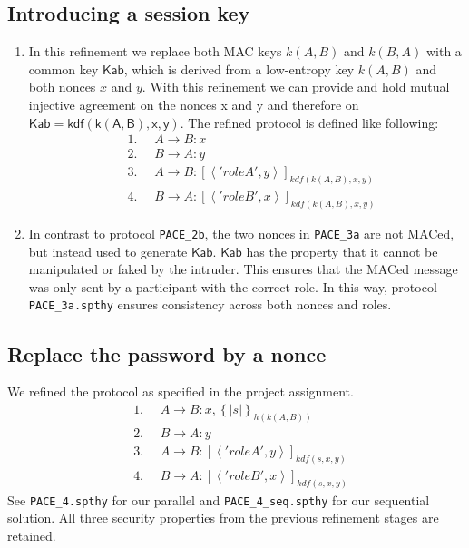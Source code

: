 \documentclass[a4paper,11pt]{scrartcl}
\newcommand{\tuple}[1]{\left\langle #1\right\rangle}
\begin{document}
\subsection{Introducing a session key}
\begin{enumerate}[label=\alph*)]
	\item In this refinement we replace both MAC keys $k(A,B)$ and $k(B,A)$ with a common key $\mathsf{Kab}$, which is derived from a low-entropy key $k(A,B)$ and both nonces $x$ and $y$.
With this refinement we can provide and hold mutual injective agreement on the nonces x and y and therefore on $\mathsf{Kab = kdf(k(A,B),x,y)}$. The refined protocol is defined like following:
	\begin{align*}
	&\text{1. }\quad A \rightarrow B: x\\
	&\text{2. }\quad B \rightarrow A: y\\
	&\text{3. }\quad A \rightarrow B: [\tuple{'roleA',  y}]_{kdf(k(A,  B), x, y)}\\
	&\text{4. }\quad B \rightarrow A: [\tuple{'roleB',  x}]_{kdf(k(A,  B), x, y)}
	\end{align*}
	\item In contrast to protocol \texttt{PACE\_2b}, the two nonces in \texttt{PACE\_3a} are not MACed, but instead used to generate $\mathsf{Kab}$.  $\mathsf{Kab}$ has the property that it cannot be manipulated or faked by the intruder. This ensures that the MACed message was only sent by a participant with the correct role. In this way,  protocol 	\texttt{PACE\_3a.spthy} ensures consistency across both nonces and roles.
\end{enumerate}
\subsection{Replace the password by a nonce}
We refined the protocol as specified in the project assignment.
	\begin{align*}
	&\text{1. }\quad A \rightarrow B: x, \left\lbrace| s | \right\rbrace_{h(k(A,B))}\\
	&\text{2. }\quad B \rightarrow A: y\\
	&\text{3. }\quad A \rightarrow B: [\tuple{'roleA',  y}]_{kdf(s, x, y)}\\
	&\text{4. }\quad B \rightarrow A: [\tuple{'roleB',  x}]_{kdf(s, x, y)}
	\end{align*}
See \texttt{PACE\_4.spthy} for our parallel and \texttt{PACE\_4\_seq.spthy} for our sequential solution.  All three security properties from the previous refinement stages are retained.
\end{document}

